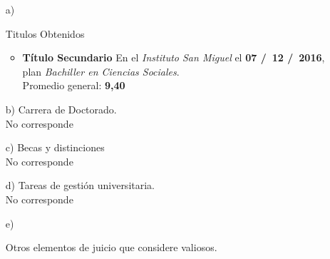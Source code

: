 \begin{enumerate}[leftmargin=0.8cm]

  \item[a)]{Titulos Obtenidos

    \begin{itemize}[leftmargin=0.2cm]

      \item {
        \textbf{Título Secundario}
        En el \emph{Instituto San Miguel} el \textbf{07 \slash \ 12 \slash \ 2016}, \\
        plan \emph{Bachiller en Ciencias Sociales}. \\
        Promedio general: \textbf{9,40}
      }

    \end{itemize}

  }

  \item[b)]{Carrera de Doctorado.
    \\ No corresponde
  }

  \item[c)]{Becas y distinciones
    \\ No corresponde
  }

  \item[d)]{Tareas de gestión universitaria.
    \\ No corresponde
  }

  \item[e)]{Otros elementos de juicio que considere valiosos. 
  
  }

\end{enumerate}

